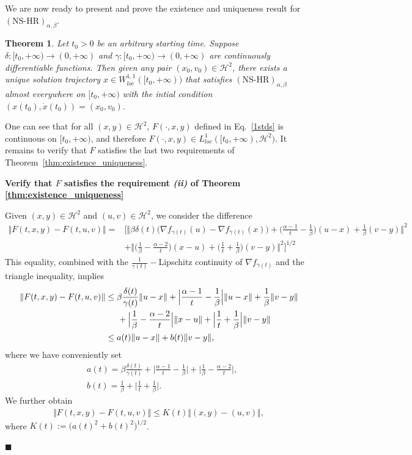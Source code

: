 \documentclass[11pt]{article}
\numberwithin{equation}{section}
\newenvironment{proof}{\bigskip\noindent{\bf Proof.}}{\hfill $\blacksquare$ \par\bigskip\noindent}
\newtheorem{theorem}{Theorem}[section]
\begin{document}
We are now ready to present and prove the existence and uniqueness result for $(\text{NS-HR})_{\alpha,\beta}$.
\begin{theorem}
    Let $t_0>0$ be an arbitrary starting time. Suppose $\delta:[t_0,+\infty
    ) \to (0,+\infty)$ and $\gamma:[t_0,+\infty
    ) \to (0,+\infty)$ are continuously differentiable functions. Then given any pair $(x_0,v_0) \in \mathcal{H}^2$, there exists a unique solution trajectory $x \in W^{1,1}_{loc}([t_0,+\infty))$ that satisfies $(\text{NS-HR})_{\alpha,\beta}$ almost everywhere on $[t_0,+\infty)$ with the intial condition $(x(t_0),\dot{x}(t_0))=(x_0,v_0)$.
\end{theorem}

\begin{proof}
One can see that for all $(x,y) \in \mathcal{H}^2$, $F(\cdot,x,y)$ defined in Eq.~\eqref{1stds} is continuous on $[t_0,+\infty)$, and therefore $F(\cdot,x,y) \in L^1_{loc}([t_0,+\infty),\mathcal{H}^2)$. It remains to verify that $F$ satisfies the last two requirements of Theorem~\ref{thm:existence_uniqueness}. 

\textbf{Verify that $F$ satisfies the requirement \textit{(ii)} of Theorem \ref{thm:existence_uniqueness}} 

Given $(x,y)\in \mathcal{H}^2$ and $(u,v)\in \mathcal{H}^2$, we consider the difference 
\begin{align*}
    \Vert F(t,x,y)-F(t,u,v)\Vert =&\Big[\Big\Vert \beta\delta(t)\Big(\nabla f_{\gamma(t)}(u)-\nabla f_{\gamma(t)}(x)\Big) +\Big(\frac{\alpha-1}{t}-\frac{1}{\beta}\Big)(u-x)+\frac{1}{\beta}(v-y)\Big\Vert^2\\
    &+\Big\Vert \Big(\frac{1}{\beta}-\frac{\alpha-2}{t}\Big)(x-u)+\Big(\frac{1}{t}+\frac{1}{\beta}\Big)(v-y) \Big\Vert^2\Big]^{1/2}
\end{align*}
This equality, combined with the $\frac{1}{\gamma(t)}-$Lipschitz continuity of $\nabla f_{\gamma(t)}$ and the triangle inequality, implies 
\begin{align*}
\Vert F(t,x,y)-F(t,u,v)\Vert &\le \beta\frac{\delta(t)}{\gamma(t)}\Vert u-x \Vert + \Big\vert\frac{\alpha-1}{t}-\frac{1}{\beta}\Big\vert\Vert u-x\Vert+\frac{1}{\beta}\Vert v-y \Vert\\
&\hspace{5mm}+\Big\vert\frac{1}{\beta}-\frac{\alpha-2}{t}\Big\vert\Vert x-u \Vert 
+\Big\vert\frac{1}{t}+\frac{1}{\beta}\Big\vert\Vert v-y \Vert \\
&\le a(t)\Vert u-x \Vert +b(t) \Vert v-y \Vert,
\end{align*}
where we have conveniently set
\begin{align*}
&a(t)=\beta\frac{\delta(t)}{\gamma(t)} +\Big\vert \frac{\alpha-1}{t}-\frac{1}{\beta}\Big\vert+\Big\vert \frac{1}{\beta}-\frac{\alpha-2}{t}\Big\vert,\\
    &b(t)=\frac{1}{\beta}+\Big\vert\frac{1}{t}+\frac{1}{\beta}\Big\vert.
\end{align*}
We further obtain 
\begin{align*}
\Vert F(t,x,y)-F(t,u,v)\Vert \le K(t)\Vert (x,y)-(u,v) \Vert,
\end{align*}
where $K(t):=\Big(a(t)^2+b(t)^2\Big)^{1/2}$. 


\end{proof}
\end{document}
